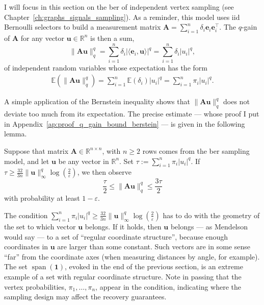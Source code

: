 I will focus in this section on the \acrfull{ber} of independent vertex sampling (see Chapter~\ref{ch:graphs_signals_sampling}). As a reminder, this model uses \acrshort{iid} Bernoulli selectors to build a measurement matrix $\mathbf{A} = \sum_{i=1}^{n} \delta_i \mathbf{e}_i \mathbf{e}_i^\top$. The $q$-gain of $\mathbf{A}$ for any vector $\mathbf{u} \in \mathbb{R}^{n}$ is then a sum,
\begin{equation}
    \|\mathbf{Au}\|_q^q = \sum_{i=1}^{n} \delta_i |\langle \mathbf{e}_i, \mathbf{u} \rangle |^q = \sum_{i=1}^{n} \delta_i |u_i|^q,
\end{equation}
of independent random variables whose expectation has the form
\begin{align}
    \mathbb{E} \left ( \|\mathbf{Au}\|_q^q \right ) = \sum_{i=1}^{n} \mathbb{E} \left ( \delta_i \right ) |u_i|^q = \sum_{i=1}^{n} \pi_i |u_i|^q.
\end{align}

A simple application of the Bernstein inequality shows that $\|\mathbf{Au}\|_q^q$ does not deviate too much from its expectation. The precise estimate --- whose proof I put in Appendix~\ref{ap:proof_q_gain_bound_berstein} --- is given in the following lemma.

\clearpage

\begin{lemma}\label{lem:q_gain_bound_berstein}
    Suppose that matrix $\mathbf{A} \in \mathbb{R}^{n \times n}$, with $n \geq 2$ rows comes from the \acrshort{ber} sampling model, and let $\mathbf{u}$ be any vector in $\mathbb{R}^{n}$. Set $\tau := \sum_{i=1}^{n} \pi_i |u_i|^q$. If $\tau \geq \frac{32}{3n} \|\mathbf{u}\|_{\infty}^q \log \left ( \frac{2}{\varepsilon} \right )$, we then observe
    \begin{equation}
        \frac{\tau}{2} \leq \|\mathbf{Au}\|_q^q \leq \frac{3\tau}{2}
    \end{equation}
    with probability at least $1 - \varepsilon$.
\end{lemma}

The condition $\sum_{i=1}^{n} \pi_i |u_i|^q \geq \frac{32}{3n} \|\mathbf{u}\|_{\infty}^q \log \left ( \frac{2}{\varepsilon} \right )$ has to do with the geometry of the set to which vector $\mathbf{u}$ belongs. If it holds, then $\mathbf{u}$ belongs --- as Mendelson~\cite{mendelson2018a} would say --- to a set of ``regular coordinate structure'', because enough coordinates in $\mathbf{u}$ are larger than some constant. Such vectors are in some sense ``far'' from the coordinate axes (when measuring distances by angle, for example). The set $\operatorname{span} \left ( \mathbf{1} \right )$, evoked in the end of the previous section, is an extreme example of a set with regular coordinate structure. Note in passing that the vertex probabilities, $\pi_1, \dots, \pi_n$, appear in the condition, indicating where the sampling design may affect the recovery guarantees.

